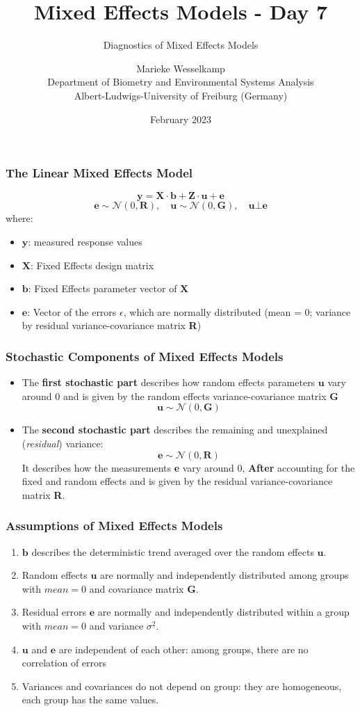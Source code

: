 \documentclass{beamer}
\title{Mixed Effects Models - Day 7}
\subtitle{Diagnostics of Mixed Effects Models}
\author{Marieke Wesselkamp\\Department of Biometry and Environmental Systems Analysis\\Albert-Ludwigs-University of Freiburg (Germany)}
\date{February 2023}
\begin{document}
\frame{\titlepage}

\begin{frame}
    \frametitle{The Linear Mixed Effects Model}
    \[
    \mathbf{y} = \mathbf{X} \cdot \mathbf{b} + \mathbf{Z} \cdot \mathbf{u} + \mathbf{e}
    \]
    \[
    \mathbf{e} \sim \mathcal{N}(0, \mathbf{R}), \quad \mathbf{u} \sim \mathcal{N}(0, \mathbf{G}), \quad \mathbf{u} \bot \mathbf{e}
    \]
    where:
    \begin{itemize}
        \item $\mathbf{y}$: measured response values
        \item $\mathbf{X}$: Fixed Effects design matrix
        \item $\mathbf{b}$: Fixed Effects parameter vector of $\mathbf{X}$
        \item $\mathbf{e}$: Vector of the errors $\epsilon$, which are normally distributed (mean = 0; variance by residual variance-covariance matrix \textbf{R})
    \end{itemize}
\end{frame}

\begin{frame}
    \frametitle{Stochastic Components of Mixed Effects Models}
    \begin{itemize}
        \item The \textbf{first stochastic part} describes how random effects parameters $\mathbf{u}$ vary around 0 and is given by the random effects variance-covariance matrix \textbf{G}
        \[
        \mathbf{u} \sim \mathcal{N}(0, \mathbf{G})
        \]
        \item The \textbf{second stochastic part} describes the remaining and unexplained (\textit{residual}) variance:
        \[
        \mathbf{e} \sim \mathcal{N}(0, \mathbf{R})
        \]
        It describes how the measurements \textbf{e} vary around 0, \textbf{After} accounting for the fixed and random effects and is given by the residual variance-covariance matrix \textbf{R}.
    \end{itemize}
\end{frame}

\begin{frame}
    \frametitle{Assumptions of Mixed Effects Models}
    \begin{enumerate}
        \item $\mathbf{b}$ describes the deterministic trend averaged over the random effects $\mathbf{u}$.
        \item Random effects $\mathbf{u}$ are normally and independently distributed among groups with $\mathit{mean = 0}$ and covariance matrix $\mathbf{G}$.
        \item Residual errors $\mathbf{e}$ are normally and independently distributed within a group with $\mathit{mean = 0}$ and variance $\sigma^2$.
        \item $\mathbf{u}$ and $\mathbf{e}$ are independent of each other: among groups, there are no correlation of errors 
        \item Variances and covariances do not depend on group: they are homogeneous, each group has the same values.
    \end{enumerate}
\end{frame}
\end{document}
